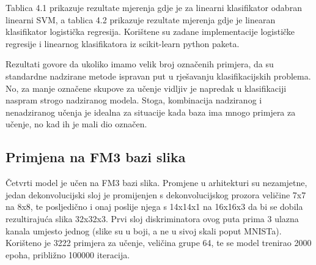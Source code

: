 \documentclass[times, utf8, diplomski]{fer}
\begin{document}
Tablica 4.1 prikazuje rezultate mjerenja gdje je za linearni klasifikator odabran linearni SVM, a tablica 4.2 prikazuje rezultate mjerenja gdje je linearan klasifikator logistička regresija. Korištene su zadane implementacije logističke regresije i linearnog klasifikatora iz scikit-learn python paketa. \par

Rezultati govore da ukoliko imamo velik broj označenih primjera, da su standardne nadzirane metode ispravan put u rješavanju klasifikacijskih problema. No, za manje označene skupove za učenje vidljiv je napredak u klasifikaciji naspram strogo nadziranog modela. Stoga, kombinacija nadziranog i nenadziranog učenja je idealna za situacije kada baza ima mnogo primjera za učenje, no kad ih je mali dio označen.

\subsection{Primjena na FM3 bazi slika}

Četvrti model je učen na FM3 bazi slika. Promjene u arhitekturi su nezamjetne, jedan dekonvolucijski sloj je promijenjen s dekonvolucijskog prozora veličine 7x7 na 8x8, te posljedično i onaj poslije njega s 14x14x1 na 16x16x3 da bi se dobila rezultirajuća slika 32x32x3. Prvi sloj diskriminatora ovog puta prima 3 ulazna kanala umjesto jednog (slike su u boji, a ne u sivoj skali poput MNISTa). Korišteno je 3222 primjera za učenje, veličina grupe 64, te se model trenirao 2000 epoha, približno 100000 iteracija. \par
\end{document}
